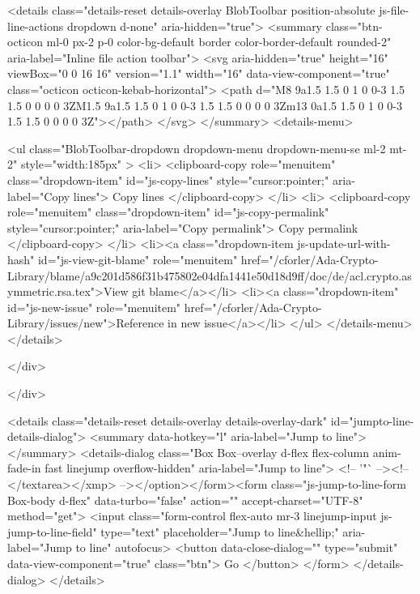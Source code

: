   <details class="details-reset details-overlay BlobToolbar position-absolute js-file-line-actions dropdown d-none" aria-hidden="true">
    <summary class="btn-octicon ml-0 px-2 p-0 color-bg-default border color-border-default rounded-2" aria-label="Inline file action toolbar">
      <svg aria-hidden="true" height="16" viewBox="0 0 16 16" version="1.1" width="16" data-view-component="true" class="octicon octicon-kebab-horizontal">
    <path d="M8 9a1.5 1.5 0 1 0 0-3 1.5 1.5 0 0 0 0 3ZM1.5 9a1.5 1.5 0 1 0 0-3 1.5 1.5 0 0 0 0 3Zm13 0a1.5 1.5 0 1 0 0-3 1.5 1.5 0 0 0 0 3Z"></path>
</svg>
    </summary>
    <details-menu>

      <ul class="BlobToolbar-dropdown dropdown-menu dropdown-menu-se ml-2 mt-2"
      style="width:185px"
      >
        <li>
          <clipboard-copy role="menuitem" class="dropdown-item" id="js-copy-lines" style="cursor:pointer;" aria-label="Copy lines">
            Copy lines
          </clipboard-copy>
        </li>
        <li>
          <clipboard-copy role="menuitem" class="dropdown-item" id="js-copy-permalink" style="cursor:pointer;" aria-label="Copy permalink">
            Copy permalink
          </clipboard-copy>
        </li>
        <li><a class="dropdown-item js-update-url-with-hash" id="js-view-git-blame" role="menuitem" href="/cforler/Ada-Crypto-Library/blame/a9c201d586f31b475802e04dfa1441e50d18d9ff/doc/de/acl.crypto.asymmetric.rsa.tex">View git blame</a></li>
          <li><a class="dropdown-item" id="js-new-issue" role="menuitem" href="/cforler/Ada-Crypto-Library/issues/new">Reference in new issue</a></li>
      </ul>
    </details-menu>
  </details>

    </div>

    </div>


  

  <details class="details-reset details-overlay details-overlay-dark" id="jumpto-line-details-dialog">
    <summary data-hotkey="l" aria-label="Jump to line"></summary>
    <details-dialog class="Box Box--overlay d-flex flex-column anim-fade-in fast linejump overflow-hidden" aria-label="Jump to line">
      <!-- '"` --><!-- </textarea></xmp> --></option></form><form class="js-jump-to-line-form Box-body d-flex" data-turbo="false" action="" accept-charset="UTF-8" method="get">
        <input class="form-control flex-auto mr-3 linejump-input js-jump-to-line-field" type="text" placeholder="Jump to line&hellip;" aria-label="Jump to line" autofocus>
          <button data-close-dialog="" type="submit" data-view-component="true" class="btn">    Go
</button>
</form>    </details-dialog>
  </details>



